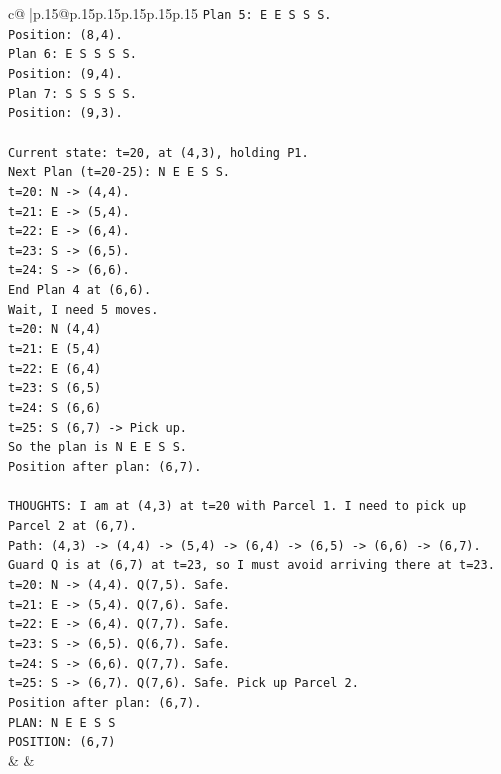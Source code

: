 \documentclass{article}
\begin{document}
{\begin{supertabular}{c@{$\;$}|p{.15\linewidth}@{}p{.15\linewidth}p{.15\linewidth}p{.15\linewidth}p{.15\linewidth}p{.15\linewidth}}
{{{\texttt{Plan 5: E E S S S.} \\
\texttt{Position: (8,4).} \\
\texttt{Plan 6: E S S S S.} \\
\texttt{Position: (9,4).} \\
\texttt{Plan 7: S S S S S.} \\
\texttt{Position: (9,3).} \\
\\ 
\texttt{Current state: t=20, at (4,3), holding P1.} \\
\texttt{Next Plan (t=20{-}25): N E E S S.} \\
\texttt{t=20: N {-}> (4,4).} \\
\texttt{t=21: E {-}> (5,4).} \\
\texttt{t=22: E {-}> (6,4).} \\
\texttt{t=23: S {-}> (6,5).} \\
\texttt{t=24: S {-}> (6,6).} \\
\texttt{End Plan 4 at (6,6).} \\
\texttt{Wait, I need 5 moves.} \\
\texttt{t=20: N (4,4)} \\
\texttt{t=21: E (5,4)} \\
\texttt{t=22: E (6,4)} \\
\texttt{t=23: S (6,5)} \\
\texttt{t=24: S (6,6)} \\
\texttt{t=25: S (6,7) {-}> Pick up.} \\
\texttt{So the plan is N E E S S.} \\
\texttt{Position after plan: (6,7).} \\
\\ 
\texttt{THOUGHTS: I am at (4,3) at t=20 with Parcel 1. I need to pick up Parcel 2 at (6,7).} \\
\texttt{Path: (4,3) {-}> (4,4) {-}> (5,4) {-}> (6,4) {-}> (6,5) {-}> (6,6) {-}> (6,7).} \\
\texttt{Guard Q is at (6,7) at t=23, so I must avoid arriving there at t=23.} \\
\texttt{t=20: N {-}> (4,4). Q(7,5). Safe.} \\
\texttt{t=21: E {-}> (5,4). Q(7,6). Safe.} \\
\texttt{t=22: E {-}> (6,4). Q(7,7). Safe.} \\
\texttt{t=23: S {-}> (6,5). Q(6,7). Safe.} \\
\texttt{t=24: S {-}> (6,6). Q(7,7). Safe.} \\
\texttt{t=25: S {-}> (6,7). Q(7,6). Safe. Pick up Parcel 2.} \\
\texttt{Position after plan: (6,7).} \\
\texttt{PLAN: N E E S S} \\
\texttt{POSITION: (6,7)} \\
            }
        }
    }
    & & \\ \\


\end{supertabular}}
\end{document}
